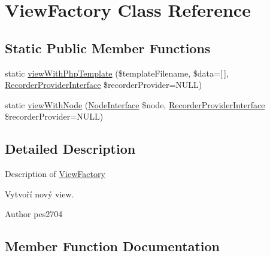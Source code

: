 \hypertarget{class_pes_1_1_view_1_1_view_factory}{}\section{View\+Factory Class Reference}
\label{class_pes_1_1_view_1_1_view_factory}
\subsection*{Static Public Member Functions}
\begin{DoxyCompactItemize}
\item 
static \mbox{\hyperlink{class_pes_1_1_view_1_1_view_factory_a99c2532e2aa286f9b117deaec80acd0d}{view\+With\+Php\+Template}} (\$template\+Filename, \$data=\mbox{[}$\,$\mbox{]}, \mbox{\hyperlink{interface_pes_1_1_view_1_1_recorder_1_1_recorder_provider_interface}{Recorder\+Provider\+Interface}} \$recorder\+Provider=N\+U\+LL)
\item 
static \mbox{\hyperlink{class_pes_1_1_view_1_1_view_factory_ac1aadfc1f7905b16ef3d0b674e3c393d}{view\+With\+Node}} (\mbox{\hyperlink{interface_pes_1_1_dom_1_1_node_1_1_node_interface}{Node\+Interface}} \$node, \mbox{\hyperlink{interface_pes_1_1_view_1_1_recorder_1_1_recorder_provider_interface}{Recorder\+Provider\+Interface}} \$recorder\+Provider=N\+U\+LL)
\end{DoxyCompactItemize}


\subsection{Detailed Description}
Description of \mbox{\hyperlink{class_pes_1_1_view_1_1_view_factory}{View\+Factory}}

Vytvoří nový view.

\begin{DoxyAuthor}{Author}
pes2704 
\end{DoxyAuthor}


\subsection{Member Function Documentation}
\mbox{\label{class_pes_1_1_view_1_1_view_factory_ac1aadfc1f7905b16ef3d0b674e3c393d}} 
